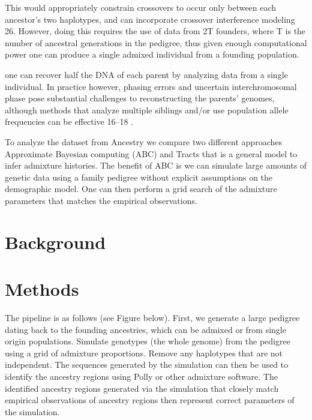 \documentclass{article}
\begin{document}
This would appropriately constrain crossovers to occur only between each ancestor’s two haplotypes, and
can incorporate crossover interference modeling 26. However, doing this requires the use of data from 2T
founders, where T is the number of ancestral generations in the pedigree, thus given enough computational power one can produce a single admixed individual from a founding population.




one can recover half the DNA of each parent by analyzing data from a single individual. In practice however, phasing errors and uncertain interchromosomal phase pose substantial challenges to reconstructing the parents’ genomes, although
methods that analyze multiple siblings and/or use population allele frequencies can be effective 16–18
.



To analyze the dataset from Ancestry we compare two different approaches Approximate Bayesian computing (ABC) and Tracts that is a general model to infer admixture histories.  The benefit of ABC is we can simulate large amounts of genetic data using a family pedigree without explicit assumptions on the demographic model.  One can then perform a grid search of the admixture parameters that matches the empirical observations.  


\section{Background}



\section{Methods}



The pipeline is as follows (see Figure below).  First, we generate a large pedigree dating back to the founding ancestries, which can be admixed or from single origin populations.  Simulate genotypes (the whole genome) from the pedigree using a grid of admixture proportions.  Remove any haplotypes that are not independent.  The sequences generated by the simulation can then be used to identify the ancestry regions using Polly or other admixture software.  The identified ancestry regions generated via the simulation that closely match empirical observations of ancestry regions then represent correct parameters of the simulation. 




\end{document}
